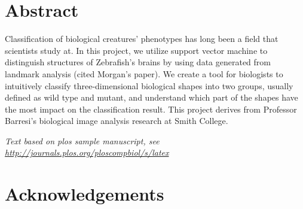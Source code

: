 \documentclass[10pt,letterpaper]{article}
\date{}
\newcommand{\getIndex}[2]{
  \ForEach{,}{\IfEq{#1}{\thislevelitem}{\number\thislevelcount\ExitForEach}{}}{#2}
}
\newcommand{\getAff}[1]{
  \getIndex{#1}{Smith College}
}
\begin{document}
\vspace*{0.2in}

\section*{Abstract}
Classification of biological creatures' phenotypes has long been a field
that scientists study at. In this project, we utilize support vector
machine to distinguish structures of Zebrafish's brains by using data
generated from landmark analysis (cited Morgan's paper). We create a
tool for biologists to intuitively classify three-dimensional biological
shapes into two groups, usually defined as wild type and mutant, and
understand which part of the shapes have the most impact on the
classification result. This project derives from Professor Barresi's
biological image analysis research at Smith College.


\linenumbers

\emph{Text based on plos sample manuscript, see
\url{http://journals.plos.org/ploscompbiol/s/latex}}

\section{Acknowledgements}\label{acknowledgements}
\end{document}
